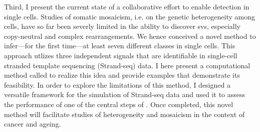 
Third, I present the current state of a collaborative effort
to enable \sv detection in single cells. Studies of somatic mosaicism, i.e. on
the genetic heterogeneity among cells, have so far been severly limited in the
ability to discover \acp{sv}, especially copy-neutral and complex rearrangements.
We hence conceived a novel method to infer---for the first time---at least seven
different \sv classes in single cells. This approach utlizes three independent
signals that are identifiable in single-cell stranded template sequencing
(Strand-seq) data. I here
present a computational method called \mc to realize this idea and provide
examples that demonstrate its feasibility. In order to explore the limitations
of this method, I designed a versatile framework for the simulation of
Strand-seq data and used it to assess the performance of one of the central
steps of \mc. Once completed, this novel method will facilitate studies of \sv
heterogeneity and mosaicism in the context of cancer and ageing.


